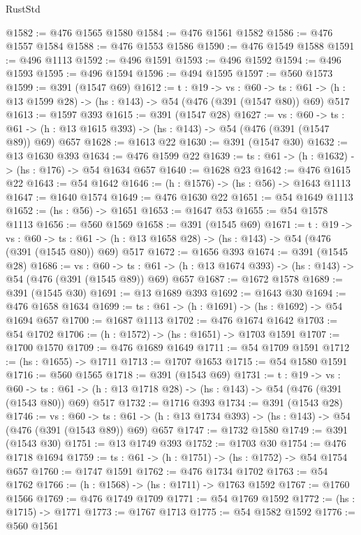 \begin{lexlean}{RustStd}
\begin{coremodule}
@1582 := @476 @1565 @1580
@1584 := @476 @1561 @1582
@1586 := @476 @1557 @1584
@1588 := @476 @1553 @1586
@1590 := @476 @1549 @1588
@1591 := @496 @1113
@1592 := @496 @1591
@1593 := @496 @1592
@1594 := @496 @1593
@1595 := @496 @1594
@1596 := @494 @1595
@1597 := @560 @1573
@1599 := @391 (@1547 @69)
@1612 := {t : @19} ->
  {vs : @60} ->
  {ts : @61} -> (h : @13 @1599 @28) -> (hs : @143) -> @54 (@476 (@391 (@1547 @80)) @69) @517
@1613 := @1597 @393
@1615 := @391 (@1547 @28)
@1627 := {vs : @60} ->
  {ts : @61} -> (h : @13 @1615 @393) -> (hs : @143) -> @54 (@476 (@391 (@1547 @89)) @69) @657
@1628 := @1613 @22
@1630 := @391 (@1547 @30)
@1632 := @13 @1630 @393
@1634 := @476 @1599 @22
@1639 := {ts : @61} -> (h : @1632) -> (hs : @176) -> @54 @1634 @657
@1640 := @1628 @23
@1642 := @476 @1615 @22
@1643 := @54 @1642
@1646 := (h : @1576) -> (hs : @56) -> @1643 @1113
@1647 := @1640 @1574
@1649 := @476 @1630 @22
@1651 := @54 @1649 @1113
@1652 := (hs : @56) -> @1651
@1653 := @1647 @53
@1655 := @54 @1578 @1113
@1656 := @560 @1569
@1658 := @391 (@1545 @69)
@1671 := {t : @19} ->
  {vs : @60} ->
  {ts : @61} -> (h : @13 @1658 @28) -> (hs : @143) -> @54 (@476 (@391 (@1545 @80)) @69) @517
@1672 := @1656 @393
@1674 := @391 (@1545 @28)
@1686 := {vs : @60} ->
  {ts : @61} -> (h : @13 @1674 @393) -> (hs : @143) -> @54 (@476 (@391 (@1545 @89)) @69) @657
@1687 := @1672 @1578
@1689 := @391 (@1545 @30)
@1691 := @13 @1689 @393
@1692 := @1643 @30
@1694 := @476 @1658 @1634
@1699 := {ts : @61} -> (h : @1691) -> (hs : @1692) -> @54 @1694 @657
@1700 := @1687 @1113
@1702 := @476 @1674 @1642
@1703 := @54 @1702
@1706 := (h : @1572) -> (hs : @1651) -> @1703 @1591
@1707 := @1700 @1570
@1709 := @476 @1689 @1649
@1711 := @54 @1709 @1591
@1712 := (hs : @1655) -> @1711
@1713 := @1707 @1653
@1715 := @54 @1580 @1591
@1716 := @560 @1565
@1718 := @391 (@1543 @69)
@1731 := {t : @19} ->
  {vs : @60} ->
  {ts : @61} -> (h : @13 @1718 @28) -> (hs : @143) -> @54 (@476 (@391 (@1543 @80)) @69) @517
@1732 := @1716 @393
@1734 := @391 (@1543 @28)
@1746 := {vs : @60} ->
  {ts : @61} -> (h : @13 @1734 @393) -> (hs : @143) -> @54 (@476 (@391 (@1543 @89)) @69) @657
@1747 := @1732 @1580
@1749 := @391 (@1543 @30)
@1751 := @13 @1749 @393
@1752 := @1703 @30
@1754 := @476 @1718 @1694
@1759 := {ts : @61} -> (h : @1751) -> (hs : @1752) -> @54 @1754 @657
@1760 := @1747 @1591
@1762 := @476 @1734 @1702
@1763 := @54 @1762
@1766 := (h : @1568) -> (hs : @1711) -> @1763 @1592
@1767 := @1760 @1566
@1769 := @476 @1749 @1709
@1771 := @54 @1769 @1592
@1772 := (hs : @1715) -> @1771
@1773 := @1767 @1713
@1775 := @54 @1582 @1592
@1776 := @560 @1561

\end{coremodule}
\end{lexlean}
